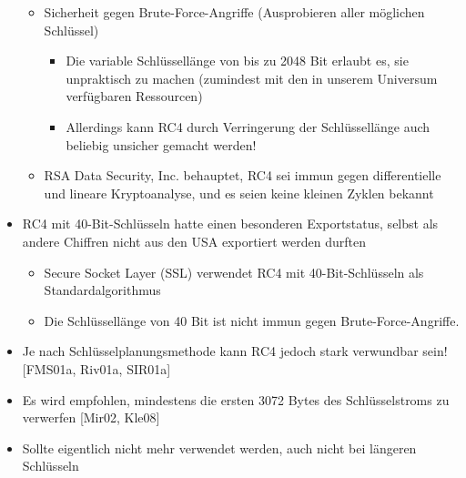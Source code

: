 \documentclass[a4paper]{article}
\begin{document}
\begin{multicols}{3}
\begin{itemize}
              \begin{itemize}
                  \item
                        Sicherheit gegen Brute-Force-Angriffe (Ausprobieren aller möglichen
                        Schlüssel)

                        \begin{itemize}
                            \item
                                  Die variable Schlüssellänge von bis zu 2048 Bit erlaubt es, sie
                                  unpraktisch zu machen (zumindest mit den in unserem Universum
                                  verfügbaren Ressourcen)
                            \item
                                  Allerdings kann RC4 durch Verringerung der Schlüssellänge auch
                                  beliebig unsicher gemacht werden!
                        \end{itemize}
                  \item
                        RSA Data Security, Inc. behauptet, RC4 sei immun gegen
                        differentielle und lineare Kryptoanalyse, und es seien keine kleinen
                        Zyklen bekannt
              \end{itemize}
        \item
              RC4 mit 40-Bit-Schlüsseln hatte einen besonderen Exportstatus, selbst
              als andere Chiffren nicht aus den USA exportiert werden durften

              \begin{itemize}
                  \item
                        Secure Socket Layer (SSL) verwendet RC4 mit 40-Bit-Schlüsseln als
                        Standardalgorithmus
                  \item
                        Die Schlüssellänge von 40 Bit ist nicht immun gegen
                        Brute-Force-Angriffe.
              \end{itemize}
        \item
              Je nach Schlüsselplanungsmethode kann RC4 jedoch stark verwundbar
              sein! {[}FMS01a, Riv01a, SIR01a{]}
        \item
              Es wird empfohlen, mindestens die ersten 3072 Bytes des
              Schlüsselstroms zu verwerfen {[}Mir02, Kle08{]}
        \item
              Sollte eigentlich nicht mehr verwendet werden, auch nicht bei längeren
              Schlüsseln
    \end{itemize}



\end{multicols}
\end{document}
